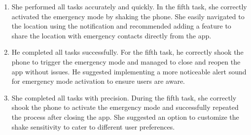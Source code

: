 \documentclass[12pt]{article}
\begin{document}
\begin{enumerate}
    \item She performed all tasks accurately and quickly. In the fifth task, she correctly activated the emergency mode by shaking the phone. She easily navigated to the location using the notification and recommended adding a feature to share the location with emergency contacts directly from the app.

    \item He completed all tasks successfully. For the fifth task, he correctly shook the phone to trigger the emergency mode and managed to close and reopen the app without issues. He suggested implementing a more noticeable alert sound for emergency mode activation to ensure users are aware.
    
    \item She completed all tasks with precision. During the fifth task, she correctly shook the phone to activate the emergency mode and successfully repeated the process after closing the app. She suggested an option to customize the shake sensitivity to cater to different user preferences.
\end{enumerate}
\end{document}
